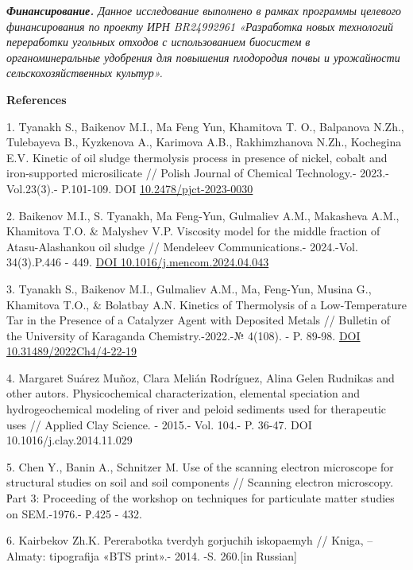 \begin{multicols}{2}
\emph{{\bfseries Финансирование.} Данное исследование выполнено в рамках
программы целевого финансирования по проекту ИРН BR24992961 «Разработка
новых технологий переработки угольных отходов с использованием биосистем
в органоминеральные удобрения для повышения плодородия почвы и
урожайности сельскохозяйственных культур».}
\end{multicols}

\begin{center}
{\bfseries References}
\end{center}

\begin{references}
1. Tyanakh S., Baikenov M.I., Ma Feng Yun, Khamitova T. O., Balpanova
N.Zh., Tulebayeva B., Kyzkenova A., Karimova A.B., Rakhimzhanova N.Zh.,
Kochegina E.V\emph{.} Kinetic of oil sludge thermolysis process in
presence of nickel, cobalt and iron-supported microsilicate // Polish
Journal of Chemical Technology.- 2023.- Vol.23(3).- P.101-109. DOI
\href{https://doi.org/10.2478/pjct-2023-0030}{10.2478/pjct-2023-0030}

2. Baikenov M.I., S. Tyanakh, Ma Feng-Yun, Gulmaliev A.M., Makasheva
A.M., Khamitova T.O. \& Malyshev V.P. Viscosity model for the middle
fraction of Atasu-Alashankou oil sludge // Mendeleev Communications.-
2024.-Vol. 34(3).P.446 - 449.
\href{https://doi.org/10.1016/j.mencom.2024.04.043}{DOI
10.1016/j.mencom.2024.04.043}

3. Tyanakh S., Baikenov M.I., Gulmaliev A.M., Ma, Feng-Yun, Musina G.,
Khamitova T.O., \& Bolatbay A.N\emph{.} Kinetics of Thermolysis of a
Low-Temperature Tar in the Presence of a Catalyzer Agent with Deposited
Metals // Bulletin of the University of Karaganda Chemistry.-2022.-№
4(108). - P. 89-98. \href{https://doi.org/10.31489/2022Ch4/4-22-19}{DOI
10.31489/2022Ch4/4-22-19}

4. Margaret Suárez Muñoz, Clara Melián Rodríguez, Alina Gelen Rudnikas
and other autors. Physicochemical characterization, elemental speciation
and hydrogeochemical modeling of river and peloid sediments used for
therapeutic uses // Applied Clay Science. - 2015.- Vol. 104.- P. 36-47.
DOI 10.1016/j.clay.2014.11.029

5. Chen Y., Banin A., Schnitzer M. Use of the scanning electron
microscope for structural studies on soil and soil components //
Scanning electron microscopy. Рart 3: Proceeding of the workshop on
techniques for particulate matter studies on SEM.-1976.- Р.425 - 432.

6. Kairbekov Zh.K. Pererabotka tverdyh gorjuchih iskopaemyh // Kniga, --
Almaty: tipografija «BTS print».- 2014. -S. 260.{[}in Russian{]}


\end{references}

